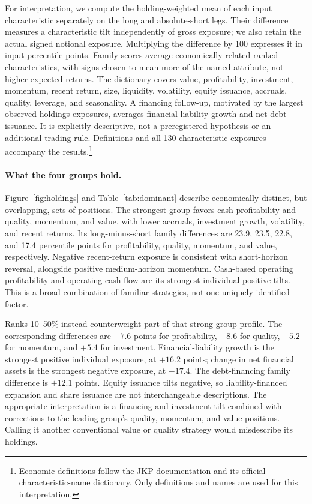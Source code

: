 \documentclass[12pt,letterpaper]{article}
\begin{document}
For interpretation, we compute the holding-weighted mean of each input characteristic separately on the long and absolute-short legs. Their difference measures a characteristic tilt independently of gross exposure; we also retain the actual signed notional exposure. Multiplying the difference by 100 expresses it in input percentile points. Family scores average economically related ranked characteristics, with signs chosen to mean more of the named attribute, not higher expected returns. The dictionary covers value, profitability, investment, momentum, recent return, size, liquidity, volatility, equity issuance, accruals, quality, leverage, and seasonality. A financing follow-up, motivated by the largest observed holdings exposures, averages financial-liability growth and net debt issuance. It is explicitly descriptive, not a preregistered hypothesis or an additional trading rule. Definitions and all 130 characteristic exposures accompany the results.\footnote{Economic definitions follow the \href{https://jkpfactors-data.s3.amazonaws.com/documents/Documentation.pdf}{JKP documentation} and its official characteristic-name dictionary. Only definitions and names are used for this interpretation.}

\paragraph{What the four groups hold.}
Figure~\ref{fig:holdings} and Table~\ref{tab:dominant} describe economically distinct, but overlapping, sets of positions. The strongest group favors cash profitability and quality, momentum, and value, with lower accruals, investment growth, volatility, and recent returns. Its long-minus-short family differences are 23.9, 23.5, 22.8, and 17.4 percentile points for profitability, quality, momentum, and value, respectively. Negative recent-return exposure is consistent with short-horizon reversal, alongside positive medium-horizon momentum. Cash-based operating profitability and operating cash flow are its strongest individual positive tilts. This is a broad combination of familiar strategies, not one uniquely identified factor.

Ranks 10--50\% instead counterweight part of that strong-group profile. The corresponding differences are $-7.6$ points for profitability, $-8.6$ for quality, $-5.2$ for momentum, and $+5.4$ for investment. Financial-liability growth is the strongest positive individual exposure, at $+16.2$ points; change in net financial assets is the strongest negative exposure, at $-17.4$. The debt-financing family difference is $+12.1$ points. Equity issuance tilts negative, so liability-financed expansion and share issuance are not interchangeable descriptions. The appropriate interpretation is a financing and investment tilt combined with corrections to the leading group's quality, momentum, and value positions. Calling it another conventional value or quality strategy would misdescribe its holdings.
\end{document}
